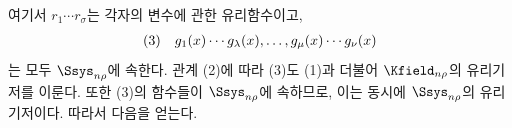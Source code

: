 
여기서 $r_1\cdots r_\sigma$는 각자의 변수에 관한 유리함수이고,
\[
\begin{array}{@{}l@{\quad}c@{}}
(3)&g_1(x)\cdots g_\lambda(x),\ldots,g_\mu(x)\cdots g_\nu(x)
\end{array}
\]
는 모두 $\Ssys_{n\rho}$에 속한다. 관계 (2)에 따라 (3)도 (1)과 더불어 $\Kfield_{n\rho}$의 유리기저를 이룬다. 또한 (3)의 함수들이 $\Ssys_{n\rho}$에 속하므로, 이는 동시에 $\Ssys_{n\rho}$의 유리기저이다. 따라서 다음을 얻는다.
